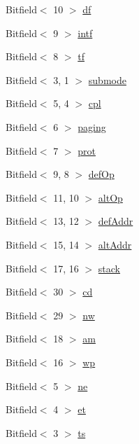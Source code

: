 \begin{DoxyCompactItemize}
\item 
Bitfield$<$ 10 $>$ \hyperlink{namespaceX86ISA_a127f55f62798fb91f307946afe9153f6}{df}
\item 
Bitfield$<$ 9 $>$ \hyperlink{namespaceX86ISA_a69939af9f719ff9a09fe8b608811dd36}{intf}
\item 
Bitfield$<$ 8 $>$ \hyperlink{namespaceX86ISA_a347f2ffe1b3ef3fa2a7f060427542e16}{tf}
\item 
Bitfield$<$ 3, 1 $>$ \hyperlink{namespaceX86ISA_ab30bbee1e7dd0bab4b2eb102e453af6c}{submode}
\item 
Bitfield$<$ 5, 4 $>$ \hyperlink{namespaceX86ISA_a5ec16f9134b8d16f25ff0c2d1723f354}{cpl}
\item 
Bitfield$<$ 6 $>$ \hyperlink{namespaceX86ISA_a42d5421edead2baa14d54eafe4947d7c}{paging}
\item 
Bitfield$<$ 7 $>$ \hyperlink{namespaceX86ISA_aeebbde702952c30a09bf3e8d01fca3bf}{prot}
\item 
Bitfield$<$ 9, 8 $>$ \hyperlink{namespaceX86ISA_af30140b2610974cf2490f734e747deb9}{defOp}
\item 
Bitfield$<$ 11, 10 $>$ \hyperlink{namespaceX86ISA_a88e1c884eaf94e7cabc69033f23bf58f}{altOp}
\item 
Bitfield$<$ 13, 12 $>$ \hyperlink{namespaceX86ISA_aee9993382bb3118144cebc341c145200}{defAddr}
\item 
Bitfield$<$ 15, 14 $>$ \hyperlink{namespaceX86ISA_aaccf902caa5b987fcd9cf699d04caa3a}{altAddr}
\item 
Bitfield$<$ 17, 16 $>$ \hyperlink{namespaceX86ISA_a5398b6bccfd40edca69968c017b88a8e}{stack}
\item 
Bitfield$<$ 30 $>$ \hyperlink{namespaceX86ISA_ab0ba74813c0fab204c3806bbe932ff11}{cd}
\item 
Bitfield$<$ 29 $>$ \hyperlink{namespaceX86ISA_a350c00808b9b0d5a91adb46b85bd1dd4}{nw}
\item 
Bitfield$<$ 18 $>$ \hyperlink{namespaceX86ISA_a7202af197ecd3b331e51cc55a7d45984}{am}
\item 
Bitfield$<$ 16 $>$ \hyperlink{namespaceX86ISA_a19a8faa204e13d1459955bbbd47eb9b0}{wp}
\item 
Bitfield$<$ 5 $>$ \hyperlink{namespaceX86ISA_a35dcb8af6346f44d62932d07e62d6ab9}{ne}
\item 
Bitfield$<$ 4 $>$ \hyperlink{namespaceX86ISA_a2ae5e47f2076db2eaecbb358869d8670}{et}
\item 
Bitfield$<$ 3 $>$ \hyperlink{namespaceX86ISA_a9e06678d082160539f4b2004aa2bdc03}{ts}
\item 

\end{DoxyCompactItemize}
